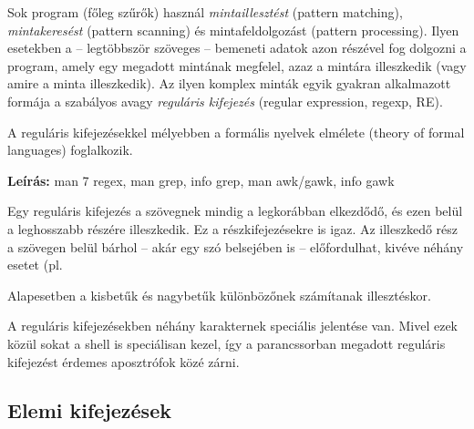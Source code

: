 
Sok program (főleg szűrők) használ \emph{mintaillesztést} (pattern matching), \emph{mintakeresést} (pattern scanning) és mintafeldolgozást (pattern processing). Ilyen esetekben a -- legtöbbször szöveges -- bemeneti adatok azon részével fog dolgozni a program, amely egy megadott mintának megfelel, azaz a mintára illeszkedik (vagy amire a minta illeszkedik). Az ilyen komplex minták egyik gyakran alkalmazott formája a szabályos avagy \emph{reguláris kifejezés} (regular expression, regexp, RE).

A reguláris kifejezésekkel mélyebben a formális nyelvek elmélete (theory of formal languages) foglalkozik.

\bigskip

\textbf{Leírás:} man 7 regex, man grep, info grep, man awk/gawk, info gawk

\bigskip

Egy reguláris kifejezés a szövegnek mindig a legkorábban elkezdődő, és ezen belül a leghosszabb részére illeszkedik. Ez a részkifejezésekre is igaz. Az illeszkedő rész a szövegen belül bárhol – akár egy szó belsejében is – előfordulhat, kivéve néhány esetet (pl. %

Alapesetben a kisbetűk és nagybetűk különbözőnek számítanak illesztéskor.

A reguláris kifejezésekben néhány karakternek speciális jelentése van. Mivel ezek közül sokat a shell is speciálisan kezel, így a parancssorban megadott reguláris kifejezést érdemes aposztrófok közé zárni.

\subsection{Elemi kifejezések}

